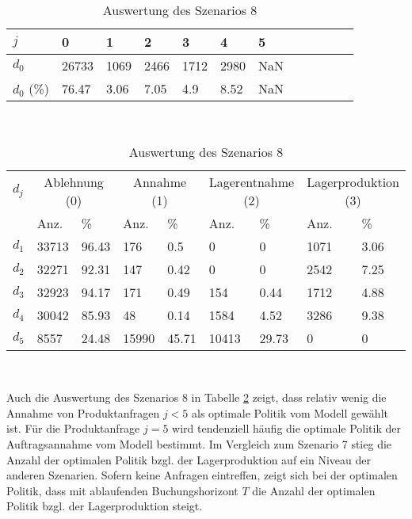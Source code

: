 \begin{table}[h!]
\renewcommand{\arraystretch}{1.5}
  \begin{center}
    \caption{Auswertung des Szenarios 8}  \label{AS8}
    \vspace*{3mm}
    \begin{tabular}{l l l l l l l l l l l l }  \hline 
         $j$ & 0 & 1  & 2 & 3 & 4  & 5   \\  \hline
$d_{0}$ &  26733 &  1069 &  2466 &  1712 &  2980 &  NaN \\
$d_{0}$ (\%) &  76.47 &  3.06 &  7.05 &   4.9 &  8.52 &  NaN \\
\hline
    \end{tabular} \\[3mm]
        \begin{tabular}{ l l l l l l l l l}   \hline    %
    $d_j$ & \multicolumn{2}{c}{Ablehnung (0)} & \multicolumn{2}{c}{Annahme (1)}  & \multicolumn{2}{c}{Lagerentnahme (2)} & \multicolumn{2}{c}{Lagerproduktion (3)}\\
    & Anz. & \% & Anz. & \% & Anz. & \% & Anz. & \% \\ \hline 
$d_{1}$ &  33713 &  96.43 &    176 &    0.5 &    0 &    0 &  1071 &  3.06 \\
$d_{2}$ &  32271 &  92.31 &    147 &   0.42 &    0 &    0 &  2542 &  7.25 \\
$d_{3}$ &  32923 &  94.17 &    171 &   0.49 &    154 &   0.44 &  1712 &  4.88 \\
$d_{4}$ &  30042 &  85.93 &     48 &   0.14 &   1584 &   4.52 &  3286 &  9.38 \\
$d_{5}$ &   8557 &  24.48 &  15990 &  45.71 &  10413 &  29.73 &   0 &   0 \\
          \hline
   \end{tabular} \\[3mm]
     \end{center}
\end{table}

Auch die Auswertung des Szenarios 8 in Tabelle \ref{AS8} zeigt, dass relativ wenig die Annahme von Produktanfragen $j<5$ als optimale Politik vom Modell gewählt ist. Für die Produktanfrage $j=5$ wird tendenziell häufig die optimale Politik der Auftragsannahme vom Modell bestimmt. Im Vergleich zum Szenario 7 stieg die Anzahl der optimalen Politik bzgl. der Lagerproduktion auf ein Niveau der anderen Szenarien. Sofern keine Anfragen eintreffen, zeigt sich bei der optimalen Politik, dass mit ablaufenden Buchungshorizont $T$ die Anzahl der optimalen Politik bzgl. der Lagerproduktion steigt.


